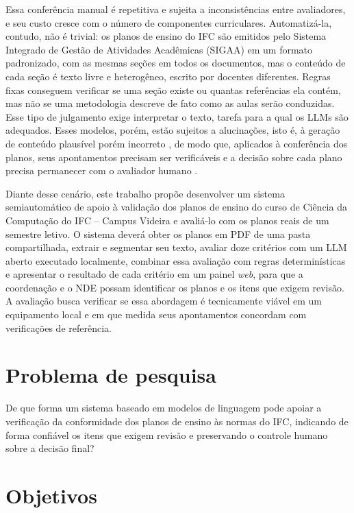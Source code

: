 Essa conferência manual é repetitiva e sujeita a inconsistências entre avaliadores, e seu custo cresce com o número de componentes curriculares. Automatizá-la, contudo, não é trivial: os planos de ensino do IFC são emitidos pelo Sistema Integrado de Gestão de Atividades Acadêmicas (SIGAA) em um formato padronizado, com as mesmas seções em todos os documentos, mas o conteúdo de cada seção é texto livre e heterogêneo, escrito por docentes diferentes. Regras fixas conseguem verificar se uma seção existe ou quantas referências ela contém, mas não se uma metodologia descreve de fato como as aulas serão conduzidas. Esse tipo de julgamento exige interpretar o texto, tarefa para a qual os LLMs são adequados. Esses modelos, porém, estão sujeitos a alucinações, isto é, à geração de conteúdo plausível porém incorreto \cite{Ji2023}, de modo que, aplicados à conferência dos planos, seus apontamentos precisam ser verificáveis e a decisão sobre cada plano precisa permanecer com o avaliador humano \cite{USDeptEd2023, Shneiderman2022}.

Diante desse cenário, este trabalho propõe desenvolver um sistema semiautomático de apoio à validação dos planos de ensino do curso de Ciência da Computação do IFC -- Campus Videira e avaliá-lo com os planos reais de um semestre letivo. O sistema deverá obter os planos em PDF de uma pasta compartilhada, extrair e segmentar seu texto, avaliar doze critérios com um LLM aberto executado localmente, combinar essa avaliação com regras determinísticas e apresentar o resultado de cada critério em um painel \textit{web}, para que a coordenação e o NDE possam identificar os planos e os itens que exigem revisão. A avaliação busca verificar se essa abordagem é tecnicamente viável em um equipamento local e em que medida seus apontamentos concordam com verificações de referência.

\section{Problema de pesquisa}

De que forma um sistema baseado em modelos de linguagem pode apoiar a verificação da conformidade dos planos de ensino às normas do IFC, indicando de forma confiável os itens que exigem revisão e preservando o controle humano sobre a decisão final?

\section{Objetivos}

